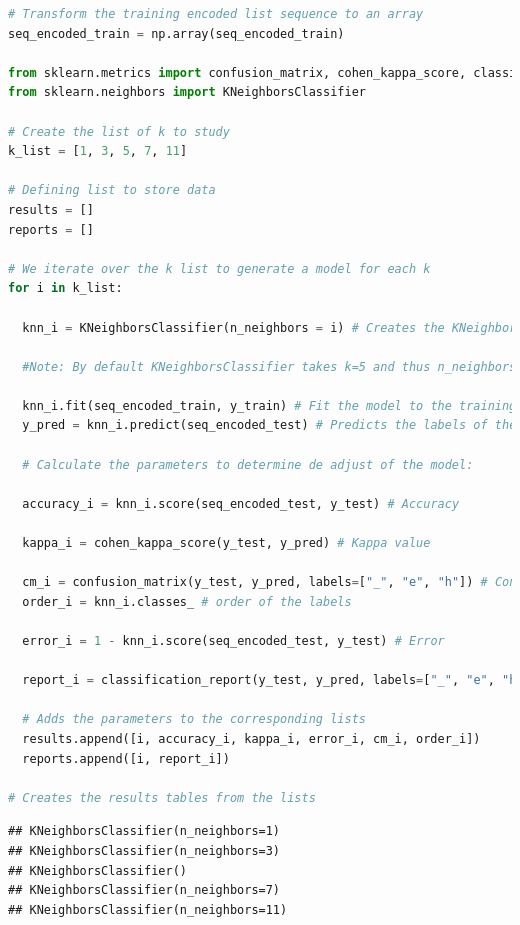 \documentclass[
]{article}
\begin{document}
\begin{lstlisting}[language=Python]
# Transform the training encoded list sequence to an array
seq_encoded_train = np.array(seq_encoded_train)

from sklearn.metrics import confusion_matrix, cohen_kappa_score, classification_report
from sklearn.neighbors import KNeighborsClassifier

# Create the list of k to study
k_list = [1, 3, 5, 7, 11]

# Defining list to store data
results = []
reports = []

# We iterate over the k list to generate a model for each k
for i in k_list:

  knn_i = KNeighborsClassifier(n_neighbors = i) # Creates the KNeighborsClassifier object with k=i
  
  #Note: By default KNeighborsClassifier takes k=5 and thus n_neighbors=5 is not printed in the console
  
  knn_i.fit(seq_encoded_train, y_train) # Fit the model to the training set
  y_pred = knn_i.predict(seq_encoded_test) # Predicts the labels of the test data
  
  # Calculate the parameters to determine de adjust of the model:
  
  accuracy_i = knn_i.score(seq_encoded_test, y_test) # Accuracy
  
  kappa_i = cohen_kappa_score(y_test, y_pred) # Kappa value
  
  cm_i = confusion_matrix(y_test, y_pred, labels=["_", "e", "h"]) # Confusion matrix
  order_i = knn_i.classes_ # order of the labels

  error_i = 1 - knn_i.score(seq_encoded_test, y_test) # Error
  
  report_i = classification_report(y_test, y_pred, labels=["_", "e", "h"]) # Report
  
  # Adds the parameters to the corresponding lists
  results.append([i, accuracy_i, kappa_i, error_i, cm_i, order_i])
  reports.append([i, report_i])
  
# Creates the results tables from the lists
\end{lstlisting}

\begin{lstlisting}
## KNeighborsClassifier(n_neighbors=1)
## KNeighborsClassifier(n_neighbors=3)
## KNeighborsClassifier()
## KNeighborsClassifier(n_neighbors=7)
## KNeighborsClassifier(n_neighbors=11)
\end{lstlisting}
\end{document}
